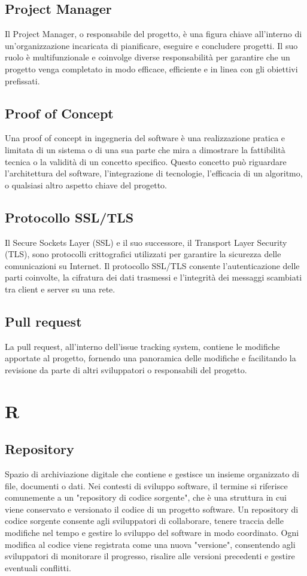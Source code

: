 \documentclass{article}
\begin{document}
\subsection{Project Manager}
Il Project Manager, o responsabile del progetto, è una figura chiave all'interno di un'organizzazione incaricata di pianificare, eseguire e concludere progetti. Il suo ruolo è multifunzionale e coinvolge diverse responsabilità per garantire che un progetto venga completato in modo efficace, efficiente e in linea con gli obiettivi prefissati.

\subsection{Proof of Concept}
Una proof of concept in ingegneria del software è una realizzazione pratica e limitata di un sistema o di una sua parte che mira a dimostrare la fattibilità tecnica o la validità di un concetto specifico. Questo concetto può riguardare l'architettura del software, l'integrazione di tecnologie, l'efficacia di un algoritmo, o qualsiasi altro aspetto chiave del progetto.

\subsection{Protocollo SSL/TLS}
Il Secure Sockets Layer (SSL) e il suo successore, il Transport Layer Security (TLS), sono protocolli crittografici utilizzati per garantire la sicurezza delle comunicazioni su Internet. Il protocollo SSL/TLS consente l'autenticazione delle parti coinvolte, la cifratura dei dati trasmessi e l'integrità dei messaggi scambiati tra client e server su una rete.

\subsection{Pull request}
La pull request, all'interno dell'issue tracking system, contiene le modifiche apportate al progetto, fornendo una panoramica delle modifiche e facilitando la revisione da parte di altri sviluppatori o responsabili del progetto.

\section{R}
\subsection{Repository}
Spazio di archiviazione digitale che contiene e gestisce un insieme organizzato di file, documenti o dati. Nei contesti di sviluppo software, il termine si riferisce comunemente a un "repository di codice sorgente", che è una struttura in cui viene conservato e versionato il codice di un progetto software. Un repository di codice sorgente consente agli sviluppatori di collaborare, tenere traccia delle modifiche nel tempo e gestire lo sviluppo del software in modo coordinato. Ogni modifica al codice viene registrata come una nuova "versione", consentendo agli sviluppatori di monitorare il progresso, risalire alle versioni precedenti e gestire eventuali conflitti.
\end{document}
